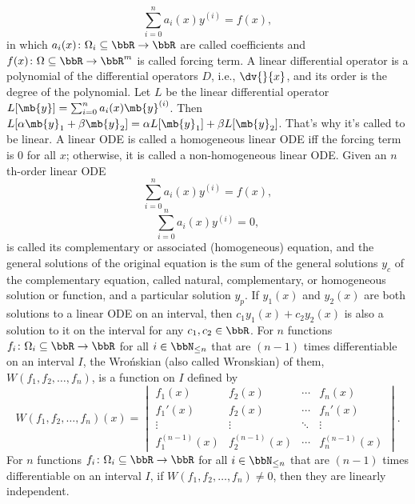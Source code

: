 \documentclass[a4paper,12pt]{report}
\begin{document}
\[\sum_{i=0}^na_i(x)y^{(i)}=f(x),\]
in which $a_i(x)\colon\Omega_i\subseteq\bbR\to\bbR$ are called coefficients and $f(x)\colon\Omega\subseteq\bbR\to\bbR^m$ is called forcing term.
A linear differential operator is a polynomial of the differential operators $D$, i.e., $\dv{}{x}$, and its order is the degree of the polynomial.
Let $L$ be the linear differential operator $L[\mb{y}]=\sum_{i=0}^na_i(x)\mb{y}^{(i)}$. Then $L[\alpha\mb{y}_1+\beta\mb{y}_2]=\alpha L[\mb{y}_1]+\beta L[\mb{y}_2]$. That's why it's called to be linear.
A linear ODE is called a homogeneous linear ODE iff the forcing term is 0 for all $x$; otherwise, it is called a non-homogeneous linear ODE.
Given an $n$th-order linear ODE
\[\sum_{i=0}^na_i(x)y^{(i)}=f(x),\]
\[\sum_{i=0}^na_i(x)y^{(i)}=0,\]
is called its complementary or associated (homogeneous) equation, and the general solutions of the original equation is the sum of the general solutions $y_c$ of the complementary equation, called natural, complementary, or homogeneous solution or function, and a particular solution $y_p$.
If $y_1(x)$ and $y_2(x)$ are both solutions to a linear ODE on an interval, then $c_1y_1(x)+c_2y_2(x)$ is also a solution to it on the interval for any $c_1,c_2\in\bbR$.
For $n$ functions $f_i\colon\Omega_i\subseteq\bbR\to\bbR$ for all $i\in\bbN_{\le n}$ that are $(n-1)$ times differentiable on an interval $I$, the Wrońskian (also called Wronskian) of them, $W(f_1,f_2,\ldots,f_n)$, is a function on $I$ defined by
\[W(f_1,f_2,\ldots,f_n)(x)=\begin{vmatrix}
f_1(x) & f_2(x) & \cdots & f_n(x) \\
f_1'(x) & f_2(x) & \cdots & f_n'(x) \\
\vdots & \vdots & \ddots & \vdots \\
f_1^{(n-1)}(x) & f_2^{(n-1)}(x) & \cdots & f_n^{(n-1)}(x)
\end{vmatrix}.\]
For $n$ functions $f_i\colon\Omega_i\subseteq\bbR\to\bbR$ for all $i\in\bbN_{\le n}$ that are $(n-1)$ times differentiable on an interval $I$, if $W(f_1,f_2,\ldots,f_n)\ne0$, then they are linearly independent.
\end{document}
